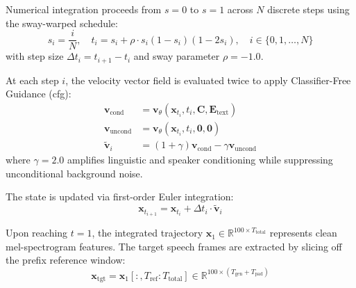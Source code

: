 Numerical integration proceeds from $s=0$ to $s=1$ across $N$ discrete steps using the sway-warped schedule:
\begin{equation}
    s_i = \frac{i}{N}, \quad t_i = s_i + \rho \cdot s_i(1 - s_i)(1 - 2s_i), \quad i \in \{0, 1, \dots, N\}
    \label{eq:sway_steps}
\end{equation}
with step size $\Delta t_i = t_{i+1} - t_i$ and sway parameter $\rho = -1.0$.

At each step $i$, the velocity vector field is evaluated twice to apply Classifier-Free Guidance (\gls{cfg}):
\begin{align}
    \mathbf{v}_{\text{cond}} &= \mathbf{v}_\theta(\mathbf{x}_{t_i}, t_i, \mathbf{C}, \mathbf{E}_{\text{text}}) \label{eq:v_cond} \\
    \mathbf{v}_{\text{uncond}} &= \mathbf{v}_\theta(\mathbf{x}_{t_i}, t_i, \mathbf{0}, \mathbf{0}) \label{eq:v_uncond} \\
    \tilde{\mathbf{v}}_i &= (1 + \gamma)\mathbf{v}_{\text{cond}} - \gamma \mathbf{v}_{\text{uncond}} \label{eq:v_guided}
\end{align}
where $\gamma = 2.0$ amplifies linguistic and speaker conditioning while suppressing unconditional background noise.

The state is updated via first-order Euler integration:
\begin{equation}
    \mathbf{x}_{t_{i+1}} = \mathbf{x}_{t_i} + \Delta t_i \cdot \tilde{\mathbf{v}}_i
    \label{eq:euler_step}
\end{equation}

Upon reaching $t=1$, the integrated trajectory $\mathbf{x}_1 \in \mathbb{R}^{100 \times T_{\text{total}}}$ represents clean mel-spectrogram features. The target speech frames are extracted by slicing off the prefix reference window:
\begin{equation}
    \mathbf{x}_{\text{tgt}} = \mathbf{x}_1[:, T_{\text{ref}} : T_{\text{total}}] \in \mathbb{R}^{100 \times (T_{\text{gen}} + T_{\text{pad}})}
    \label{eq:slicing_operation}
\end{equation}

